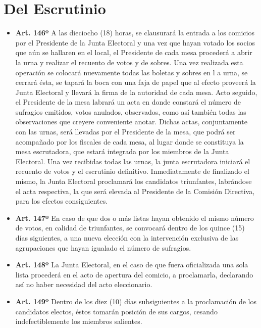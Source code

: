 \documentclass[]{book}
\begin{document}
\section{Del Escrutinio}\label{del-escrutinio}

\begin{itemize}
\item
  \textbf{Art. 146º} A las dieciocho (18) horas, se clausurará la
  entrada a los comicios por el Presidente de la Junta Electoral y una
  vez que hayan votado los socios que aún se hallaren en el local, el
  Presidente de cada mesa procederá a abrir la urna y realizar el
  recuento de votos y de sobres. Una vez realizada esta operación se
  colocará nuevamente todas las boletas y sobres en l a urna, se cerrará
  ésta, se tapará la boca con una faja de papel que al efecto proveerá
  la Junta Electoral y llevará la firma de la autoridad de cada mesa.
  Acto seguido, el Presidente de la mesa labrará un acta en donde
  constará el número de sufragios emitidos, votos anulados, observados,
  como así también todas las observaciones que creyere conveniente
  anotar. Dichas actas, conjuntamente con las urnas, será llevadas por
  el Presidente de la mesa, que podrá ser acompañado por los fiscales de
  cada mesa, al lugar donde se constituya la mesa escrutadora, que
  estará integrada por los miembros de la Junta Electoral. Una vez
  recibidas todas las urnas, la junta escrutadora iniciará el recuento
  de votos y el escrutinio definitivo. Inmediatamente de finalizado el
  mismo, la Junta Electoral proclamará los candidatos triunfantes,
  labrándose el acta respectiva, la que será elevada al Presidente de la
  Comisión Directiva, para los efectos consiguientes.
\item
  \textbf{Art. 147º} En caso de que dos o más listas hayan obtenido el
  mismo número de votos, en calidad de triunfantes, se convocará dentro
  de los quince (15) días siguientes, a una nueva elección con la
  intervención exclusiva de las agrupaciones que hayan igualado el
  número de sufragios.
\end{itemize}

\begin{itemize}
\item
  \textbf{Art. 148º} La Junta Electoral, en el caso de que fuera
  oficializada una sola lista procederá en el acto de apertura del
  comicio, a proclamarla, declarando así no haber necesidad del acto
  eleccionario.
\item
  \textbf{Art. 149º} Dentro de los diez (10) días subsiguientes a la
  proclamación de los candidatos electos, éstos tomarán posición de sus
  cargos, cesando indefectiblemente los miembros salientes.
\end{itemize}
\end{document}
